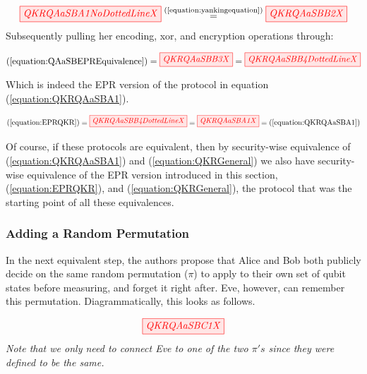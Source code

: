 \documentclass[]{article}
\newcommand{\equaltext}[1]{\ensuremath{\stackrel{\text{#1}}{=}}}
\begin{document}
\begin{equation}
	\label{equation:QAaSBEPREquivalence}
	\begin{aligned}
	\tikzfig{QKRQAaSBA1NoDottedLineX} \equaltext{(\ref{equation:yankingequation})} \tikzfig{QKRQAaSBB2X}
	\end{aligned}
\end{equation}
\newline
Subsequently pulling her encoding, xor, and encryption operations through:

\begin{equation}
\label{equation:EPRQKR}
	\begin{aligned}
 (\ref{equation:QAaSBEPREquivalence}) = \tikzfig{QKRQAaSBB3X} = \tikzfig{QKRQAaSBB4DottedLineX}
\end{aligned}
\end{equation}

Which is indeed the EPR version of the protocol in equation (\ref{equation:QKRQAaSBA1}).

\begin{equation}
\label{equation:QKRQAaSBB4DottedLine}
	(\ref{equation:EPRQKR}) = \tikzfig{QKRQAaSBB4DottedLineX} = \tikzfig{QKRQAaSBA1X} = (\ref{equation:QKRQAaSBA1})
\end{equation}

Of course, if these protocols are equivalent, then by security-wise equivalence of (\ref{equation:QKRQAaSBA1}) and (\ref{equation:QKRGeneral}) we also have security-wise equivalence of the EPR version introduced in this section, (\ref{equation:EPRQKR}), and (\ref{equation:QKRGeneral}), the protocol that was the starting point of all these equivalences. 

\subsubsection{Adding a Random Permutation}

In the next equivalent step, the authors propose that Alice and Bob both publicly decide on the same random permutation ($\pi$) to apply to their own set of qubit states before measuring, and forget it right after. Eve, however, can remember this permutation. Diagrammatically, this looks as follows.

\begin{equation}
	\label{equation:QKRQAaSBC1}
	\tikzfig{QKRQAaSBC1X}
\end{equation}
\textit{Note that we only need to connect Eve to one of the two $\pi's$ since they were defined to be the same.}
\end{document}
